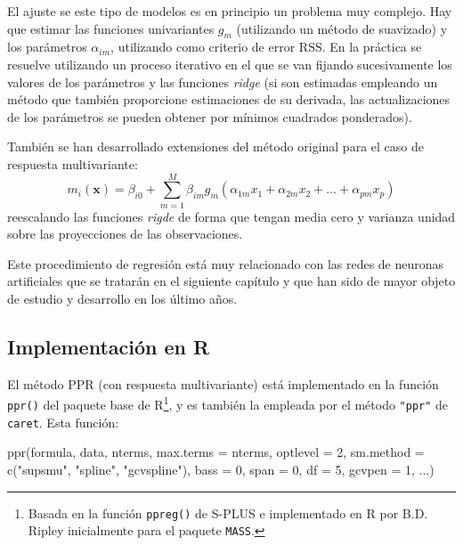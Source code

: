 \documentclass[
]{book}
\newenvironment{Shaded}{\begin{snugshade}}{\end{snugshade}}
\newcommand{\AttributeTok}[1]{\textcolor[rgb]{0.77,0.63,0.00}{#1}}
\newcommand{\DecValTok}[1]{\textcolor[rgb]{0.00,0.00,0.81}{#1}}
\newcommand{\FunctionTok}[1]{\textcolor[rgb]{0.00,0.00,0.00}{#1}}
\newcommand{\NormalTok}[1]{#1}
\newcommand{\StringTok}[1]{\textcolor[rgb]{0.31,0.60,0.02}{#1}}
\theoremstyle{break}
\theoremstyle{nonumberplain}
\begin{document}
El ajuste se este tipo de modelos es en principio un problema muy complejo.
Hay que estimar las funciones univariantes \(g_m\) (utilizando un método de suavizado) y los parámetros \(\alpha_{im}\), utilizando como criterio de error \(\mbox{RSS}\).
En la práctica se resuelve utilizando un proceso iterativo en el que se van fijando sucesivamente los valores de los parámetros y las funciones \emph{ridge} (si son estimadas empleando un método que también proporcione estimaciones de su derivada, las actualizaciones de los parámetros se pueden obtener por mínimos cuadrados ponderados).

También se han desarrollado extensiones del método original para el caso de respuesta multivariante:
\[m_i(\mathbf{x}) = \beta_{i0} + \sum_{m=1}^M \beta_{im} g_m (\alpha_{1m}x_1 + \alpha_{2m}x_2 + \ldots + \alpha_{pm}x_p)\]
reescalando las funciones \emph{rigde} de forma que tengan media cero y varianza unidad sobre las proyecciones de las observaciones.

Este procedimiento de regresión está muy relacionado con las redes de neuronas artificiales que se tratarán en el siguiente capítulo y que han sido de mayor objeto de estudio y desarrollo en los último años.

\hypertarget{implementaciuxf3n-en-r-1}{%
\subsection{Implementación en R}\label{implementaciuxf3n-en-r-1}}

El método PPR (con respuesta multivariante) está implementado en la función \texttt{ppr()} del paquete base de R\footnote{Basada en la función \texttt{ppreg()} de S-PLUS e implementado en R por B.D. Ripley inicialmente para el paquete \texttt{MASS}.}, y es también la empleada por el método \texttt{"ppr"} de \texttt{caret}.
Esta función:

\begin{Shaded}
\begin{Highlighting}[]
\FunctionTok{ppr}\NormalTok{(formula, data, nterms, }\AttributeTok{max.terms =}\NormalTok{ nterms, }\AttributeTok{optlevel =} \DecValTok{2}\NormalTok{,}
    \AttributeTok{sm.method =} \FunctionTok{c}\NormalTok{(}\StringTok{"supsmu"}\NormalTok{, }\StringTok{"spline"}\NormalTok{, }\StringTok{"gcvspline"}\NormalTok{),}
    \AttributeTok{bass =} \DecValTok{0}\NormalTok{, }\AttributeTok{span =} \DecValTok{0}\NormalTok{, }\AttributeTok{df =} \DecValTok{5}\NormalTok{, }\AttributeTok{gcvpen =} \DecValTok{1}\NormalTok{, ...)}
\end{Highlighting}
\end{Shaded}
\end{document}

